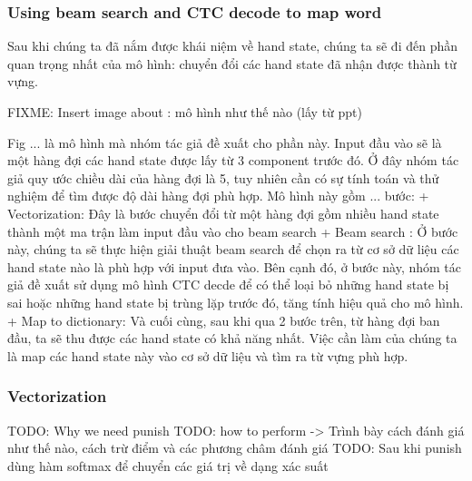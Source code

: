     \subsubsection{ Using beam search and CTC decode to map word }
      Sau khi chúng ta đã nắm được khái niệm về hand state, chúng ta sẽ đi đến phần quan trọng
      nhất của mô hình: chuyển đổi các hand state đã nhận được thành từ vựng.
      
      FIXME: Insert image about : mô hình như thế nào (lấy từ ppt)

      Fig ... là mô hình mà nhóm tác giả đề xuất cho phần này. Input đầu vào
      sẽ là một hàng đợi các hand state được lấy từ 3 component trước đó. Ở đây nhóm tác giả
      quy ước chiều dài của hàng đợi là 5, tuy nhiên cần có sự tính toán và thử nghiệm để tìm
      được độ dài hàng đợi phù hợp.
      Mô hình này gồm ... bước:
        + Vectorization: Đây là bước chuyển đổi từ một hàng đợi gồm nhiều hand state thành
        một ma trận làm input đầu vào cho beam search
        + Beam search : Ở bước này, chúng ta sẽ thực hiện giải thuật beam search để chọn ra
        từ cơ sở dữ liệu các hand state nào là phù hợp với input đưa vào. Bên cạnh đó, ở bước
        này, nhóm tác giả đề xuất sử dụng mô hình CTC decde để có thể loại bỏ những hand state bị sai
        hoặc những hand state bị trùng lặp trước đó, tăng tính hiệu quả cho mô hình.
        + Map to dictionary: Và cuối cùng, sau khi qua 2 bước trên, từ hàng đợi ban đầu, ta sẽ
        thu được các hand state có khả năng nhất. Việc cần làm của chúng ta là map các hand state
        này vào cơ sở dữ liệu và tìm ra từ vựng phù hợp.
      
    \subsubsection{ Vectorization }
      TODO: Why we need punish
      TODO: how to perform -> Trình bày cách đánh giá như thế nào, cách trừ điểm và các phương châm đánh giá
      TODO: Sau khi punish dùng hàm softmax để chuyển các giá trị về dạng xác suất


